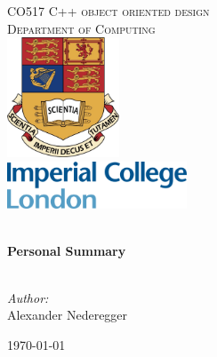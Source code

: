 \begin{titlepage}
\vbox{ }
\vbox{ }

\begin{center}
\textsc{\LARGE CO517 C++ object oriented design} \\[1.5cm]
\textsc{\Large Department of Computing}\\[0.5cm]

\vbox{}
\vbox{}
\vbox{}
\includegraphics[width=0.25\textwidth]{./1_title/images/ic_wappen}\\[1cm]
\vbox{}
\includegraphics[width=0.4\textwidth]{./1_title/images/ic_logo}\\[1cm]
\vbox{}
\vbox{}

\HRule \\[0.4cm]
{ \huge \bfseries Personal Summary}\\[0.2cm]
\HRule \\[1.5cm]

\begin{center} \large
\emph{Author:}\\
Alexander Nederegger
\end{center}

\vbox{}
\vbox{}
\vbox{}
\vbox{}
{\large \today}

\end{center}
\end{titlepage}